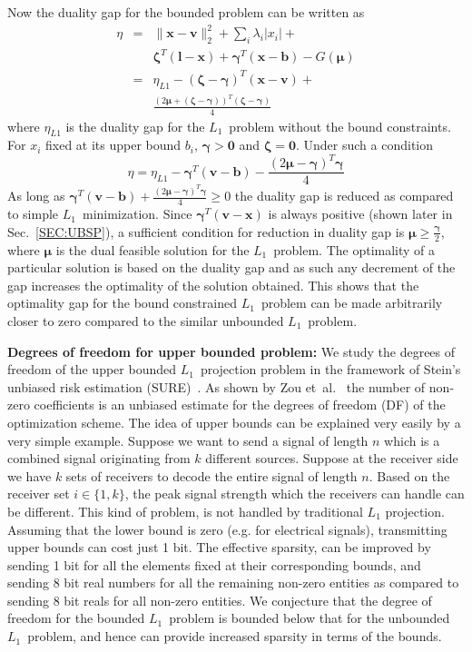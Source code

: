 \documentclass{article}
\newcommand{\mathbs}{\boldsymbol}
\def\etal{{et~al.}}
\def\Lo{$L_1$~}
\begin{document}
Now the duality gap for the bounded problem can be written as
\begin{eqnarray*}
\eta &=& \|\mathbf{x-v}\|_2^2 + \sum_i\lambda_i |x_i| + \\
  && \mathbs{\zeta}^T(\mathbf{l-x}) + \mathbs{\gamma}^T(\mathbf{x-b}) - G(\mathbs{\mu}) \\
   &=& \eta_{L1} - (\mathbs{\zeta - \gamma})^T(\mathbf{x-v})+ \\
   &&\frac{(2\mathbs{\mu+(\zeta-\gamma)})^T(\mathbs{\zeta-\gamma})}{4}
\end{eqnarray*}
where $\eta_{L1}$ is the duality gap for the \Lo problem without the bound constraints. For $x_i$ fixed at its upper bound $b_i$, $\mathbs{\gamma} > \mathbf{0}$ and $\mathbs{\zeta} = \mathbf{0}$. Under such a condition
\begin{equation*}
    \eta = \eta_{L1} - \mathbs{\gamma}^T(\mathbf{v-b})- \frac{(2\mathbs{\mu-\gamma})^T\mathbs{\gamma}}{4}
\end{equation*}
As long as $\mathbs{\gamma}^T(\mathbf{v-b}) + \frac{(2\mathbs{\mu-\gamma})^T\mathbs{\gamma}}{4} \ge 0$ the duality gap is reduced as compared to simple \Lo minimization. Since $\mathbs{\gamma}^T(\mathbf{v-x})$ is always positive (shown later in Sec.~\ref{SEC:UBSP}), a sufficient condition for reduction in duality gap is $\mathbs{\mu} \ge \frac{\mathbs{\gamma}}{2}$, where $\mathbs{\mu}$ is the dual feasible solution for the \Lo problem. The optimality of a particular solution is based on the duality gap and as such any decrement of the gap increases the optimality of the solution obtained. This shows that the optimality gap for the bound constrained \Lo problem can be made arbitrarily closer to zero compared to the similar unbounded \Lo problem.

\textbf{Degrees of freedom for upper bounded problem: }
We study the degrees of freedom of the upper bounded \Lo projection problem in the framework of Stein's unbiased risk estimation (SURE)~\cite{Stein81}. As shown by Zou \etal~\cite{Zou07} the number of non-zero coefficients is an unbiased estimate for the degrees of freedom (DF) of the optimization scheme.
The idea of upper bounds can be explained very easily by a very simple example. Suppose we want to send a signal of length $n$ which is a combined signal originating from $k$ different sources. Suppose at the receiver side we have $k$ sets of receivers to decode the entire signal of length $n$. Based on the receiver set $i\in\{1,k\}$, the peak signal strength which the receivers can handle can be different. This kind of problem, is not handled by traditional $L_1$ projection. Assuming that the lower bound is zero (e.g. for electrical signals), transmitting upper bounds can cost just 1 bit. The effective sparsity, can be improved by sending 1 bit for all the elements fixed at their corresponding bounds, and sending 8 bit real numbers for all the remaining non-zero entities as compared to sending 8 bit reals for all non-zero entities. We conjecture that the degree of freedom for the bounded \Lo problem is bounded below that for the unbounded \Lo problem, and hence can provide increased sparsity in terms of the bounds.
\end{document}
